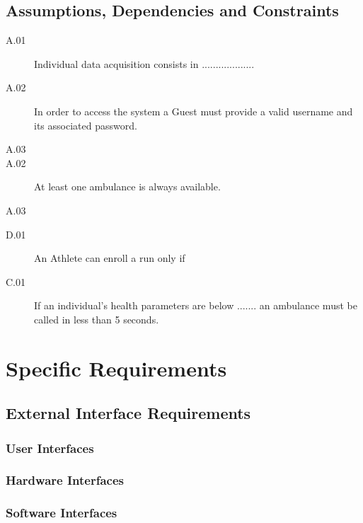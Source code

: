 \documentclass[a4paper]{article}
\begin{document}
    \subsection{Assumptions, Dependencies and Constraints}
        \begin{description}
            \item[A.01] Individual data acquisition consists in ...................
            \item[A.02] In order to access the system a Guest must provide a valid username and its associated password.
            \item[A.03]
            \item[A.02] At least one ambulance is always available.
            \item[A.03]
        \end{description}
        
        \begin{description}
            \item[D.01] An Athlete can enroll a run only if 
        \end{description}
        
        \begin{description}
            \item[C.01] If an individual's health parameters are below ....... an ambulance must be called in less than 5 seconds.
        \end{description}
\newpage
\section{Specific Requirements}

    \subsection{External Interface Requirements}
        
        \subsubsection{User Interfaces}
        
        \subsubsection{Hardware Interfaces}
        
        \subsubsection{Software Interfaces}
        
\end{document}
